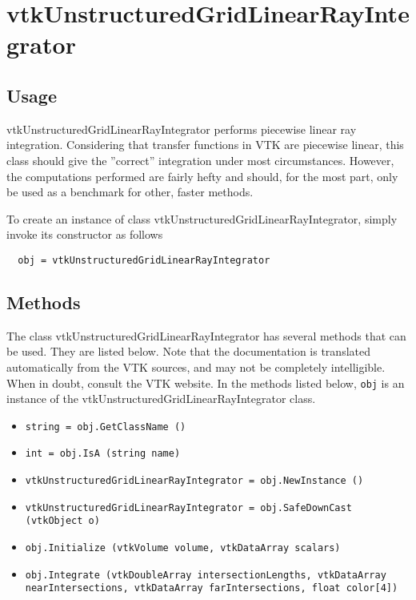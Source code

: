 \section{vtkUnstructuredGridLinearRayIntegrator}

\subsection{Usage}


 vtkUnstructuredGridLinearRayIntegrator performs piecewise linear ray
 integration.  Considering that transfer functions in VTK are piecewise
 linear, this class should give the ''correct'' integration under most
 circumstances.  However, the computations performed are fairly hefty and
 should, for the most part, only be used as a benchmark for other, faster
 methods.


To create an instance of class vtkUnstructuredGridLinearRayIntegrator, simply
invoke its constructor as follows
\begin{verbatim}
  obj = vtkUnstructuredGridLinearRayIntegrator
\end{verbatim}
\subsection{Methods}

The class vtkUnstructuredGridLinearRayIntegrator has several methods that can be used.
  They are listed below.
Note that the documentation is translated automatically from the VTK sources,
and may not be completely intelligible.  When in doubt, consult the VTK website.
In the methods listed below, \verb|obj| is an instance of the vtkUnstructuredGridLinearRayIntegrator class.
\begin{itemize}
\item  \verb|string = obj.GetClassName ()|

\item  \verb|int = obj.IsA (string name)|

\item  \verb|vtkUnstructuredGridLinearRayIntegrator = obj.NewInstance ()|

\item  \verb|vtkUnstructuredGridLinearRayIntegrator = obj.SafeDownCast (vtkObject o)|

\item  \verb|obj.Initialize (vtkVolume volume, vtkDataArray scalars)|

\item  \verb|obj.Integrate (vtkDoubleArray intersectionLengths, vtkDataArray nearIntersections, vtkDataArray farIntersections, float color[4])|

\end{itemize}
